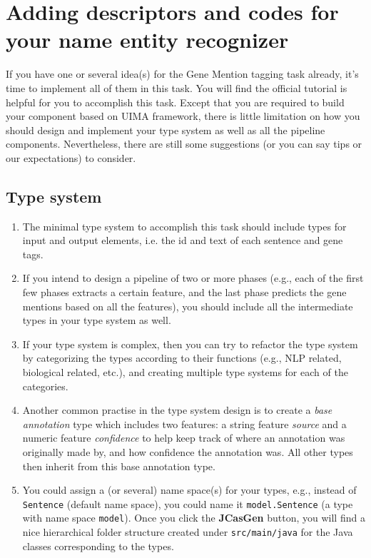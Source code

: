 
\section{Adding descriptors and codes for your name entity recognizer}

If you have one or several idea(s) for the Gene Mention tagging task already,
it's time to implement all of them in this task. You will find the official
tutorial is helpful for you to accomplish this task. Except that you are
required to build your component based on UIMA framework, there is little
limitation on how you should design and implement your type system as well as
all the pipeline components. Nevertheless, there are still some suggestions (or
you can say tips or our expectations) to consider.

\subsection{Type system}

\begin{enumerate}

\item The minimal type system to accomplish this task should include types for
input and output elements, i.e. the id and text of each sentence and gene tags.

\item If you intend to design a pipeline of two or more phases (e.g., each of
the first few phases extracts a certain feature, and the last phase predicts the
gene mentions based on all the features), you should include all the
intermediate types in your type system as well.

\item If your type system is complex, then you can try to refactor the type
system by categorizing the types according to their functions (e.g., NLP
related, biological related, etc.), and creating multiple type systems for each
of the categories.

\item Another common practise in the type system design is to create a
\emph{base annotation} type which includes two features: a string feature
\emph{source} and a numeric feature \emph{confidence} to help keep track of
where an annotation was originally made by, and how confidence the annotation
was. All other types then inherit from this base annotation type.

\item You could assign a (or several) name space(s) for your types, e.g., instead
of \texttt{Sentence} (default name space), you could name it
\texttt{model.Sentence} (a type with name space \texttt{model}). Once you click
the \textbf{JCasGen} button, you will find a nice hierarchical folder structure
created under \texttt{src/main/java} for the Java classes corresponding to the
types.

\end{enumerate}

